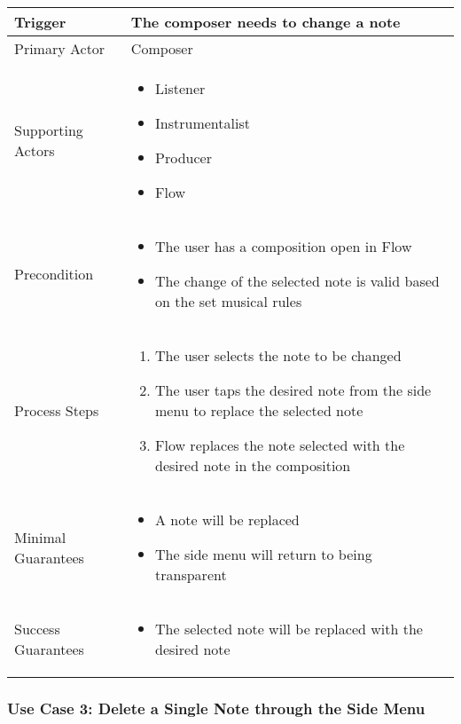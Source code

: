\begin{tabularx}{\textwidth}{|X|X|}
\hline
Trigger & 
The composer needs to change a note \\
\hline
Primary Actor & 
Composer\\
\hline
Supporting Actors & 
\begin{itemize}
\item Listener
\item Instrumentalist
\item Producer
\item Flow
\end{itemize} \\
\hline
Precondition & 
\begin{itemize}
\item The user has a composition open in Flow  
\item The change of the selected note is valid based on the set musical rules
\end{itemize} \\
\hline
Process Steps & 
\begin{enumerate}
\item The user selects the note to be changed 
\item The user taps the desired note from the side menu to replace the selected note
\item Flow replaces the note selected with the desired note in the composition
\end{enumerate} \\
\hline
Minimal Guarantees & 
\begin{itemize}
  \item A note will be replaced
  \item The side menu will return to being transparent
\end{itemize} \\
\hline
Success Guarantees & 
\begin{itemize}
  \item The selected note will be replaced with the desired note
\end{itemize} \\
\hline
\end{tabularx}


\subsubsection{Use Case 3: Delete a Single Note through the Side Menu}

